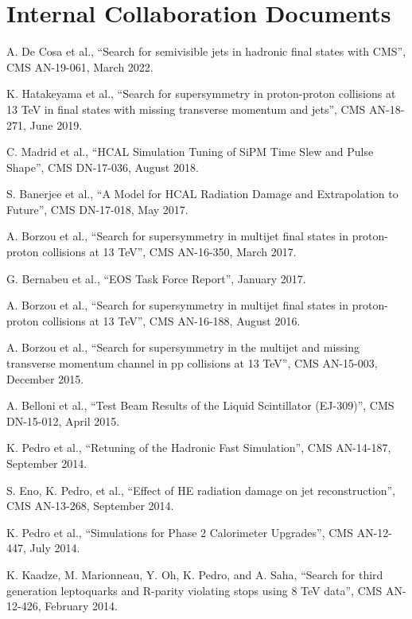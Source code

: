 \section{Internal Collaboration Documents}
\begin{nbdescription}[leftmargin=12pt,font=\normalfont,labelsep=0em]
\item A. De Cosa et al., ``Search for semivisible jets in hadronic final states with CMS'', CMS AN-19-061, March 2022.
\item K. Hatakeyama et al., ``Search for supersymmetry in proton-proton collisions at 13 TeV in final states with missing transverse momentum and jets'', CMS AN-18-271, June 2019.
\item C. Madrid et al., ``HCAL Simulation Tuning of SiPM Time Slew and Pulse Shape'', CMS DN-17-036, August 2018.
\item S. Banerjee et al., ``A Model for HCAL Radiation Damage and Extrapolation to Future'', CMS DN-17-018, May 2017.
\item A. Borzou et al., ``Search for supersymmetry in multijet final states in proton-proton collisions at 13 TeV'', CMS AN-16-350, March 2017.
\item G. Bernabeu et al., ``EOS Task Force Report'', January 2017.
\item A. Borzou et al., ``Search for supersymmetry in multijet final states in proton-proton collisions at 13 TeV'', CMS AN-16-188, August 2016.
\item A. Borzou et al., ``Search for supersymmetry in the multijet and missing transverse momentum channel in pp collisions at 13 TeV'', CMS AN-15-003, December 2015.
\item A. Belloni et al., ``Test Beam Results of the Liquid Scintillator (EJ-309)'', CMS DN-15-012, April 2015.
\item K. Pedro et al., ``Retuning of the Hadronic Fast Simulation'', CMS AN-14-187, September 2014.
\item S. Eno, K. Pedro, et al., ``Effect of HE radiation damage on jet reconstruction'', CMS AN-13-268, September 2014.
\item K. Pedro et al., ``Simulations for Phase 2 Calorimeter Upgrades'', CMS AN-12-447, July 2014.
\item K. Kaadze, M. Marionneau, Y. Oh, K. Pedro, and A. Saha, ``Search for third generation leptoquarks and R-parity violating stops using 8 TeV data'', CMS AN-12-426, February 2014.
\end{nbdescription}
\fi
